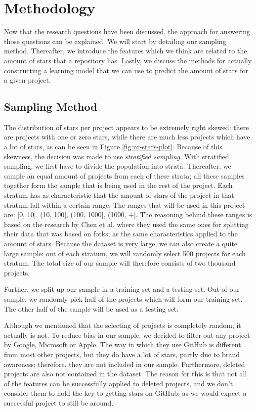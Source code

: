 \section{Methodology}
\label{sec:methodology}
    Now that the research questions have been discussed, the approach for answering those questions can be explained.
    We will start by detailing our sampling method. 
    Thereafter, we introduce the features which we think are related to the amount of stars that a repository has.
    Lastly, we discuss the methods for actually constructing a learning model that we can use to predict the amount of stars for a given project.
    \subsection{Sampling Method}
        The distribution of stars per project appears to be extremely right skewed: there are projects with one or zero stars, while there are much less projects which have a lot of stars, as can be seen in Figure \ref{fig:nr-stars-plot}.
        Because of this skewness, the decision was made to use \textit{stratified sampling}\cite{trost-1986}.
        With stratified sampling, we first have to divide the population into strata. 
        Thereafter, we sample an equal amount of projects from each of these strata; 
        all these samples together form the sample that is being used in the rest of the project.
        Each stratum has as characteristic that the amount of stars of the project in that stratum fall within a certain range. 
        The ranges that will be used in this project are: [0, 10], (10, 100], (100, 1000], (1000, +].
        The reasoning behind these ranges is based on the research by Chen et al. where they used the same ones for splitting their data that was based on forks; as the same characteristics applied to the amount of stars. \cite{chen-2014}
        Because the dataset is very large, we can also create a quite large sample:         
        out of each stratum, we will randomly select 500 projects for each stratum. The total size of our sample will therefore consists of two thousand projects.
        
        Further, we split up our sample in a training set and a testing set. Out of our sample, we randomly pick half of the projects which will form our training set. The other half of the sample will be used as a testing set.
        
        Although we mentioned that the selecting of projects is completely random, it actually is not. To reduce bias in our sample, we decided to filter out any project by Google, Microsoft or Apple.
        The way in which they use GitHub is different from most other projects, but they do have a lot of stars, partly due to brand awareness;  therefore, they are not included in our sample.
        Furthermore, deleted projects are also not contained in the dataset.
        The reason for this is that not all of the features can be successfully applied to deleted projects, and we don't consider them to hold the key to getting stars on GitHub; as we would expect a successful project to still be around.
        
